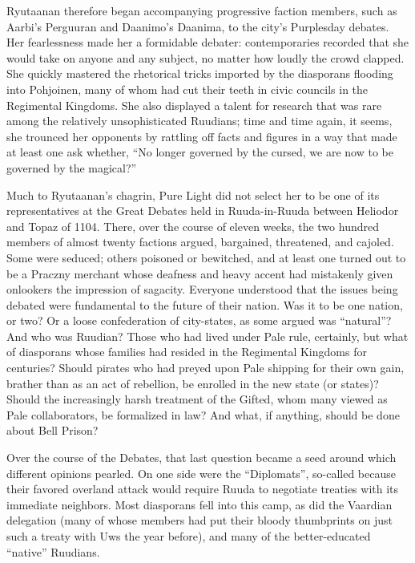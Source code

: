 \documentclass[12pt]{report}
\begin{document}
Ryutaanan therefore began accompanying progressive faction members,
such as Aarbi's Perguuran and Daanimo's Daanima, to the city's
Purplesday debates.  Her fearlessness made her a formidable debater:
contemporaries recorded that she would take on anyone and any subject,
no matter how loudly the crowd clapped.  She quickly mastered the
rhetorical tricks imported by the diasporans flooding into Pohjoinen,
many of whom had cut their teeth in civic councils in the Regimental
Kingdoms.  She also displayed a talent for research that was rare
among the relatively unsophisticated Ruudians; time and time again, it
seems, she trounced her opponents by rattling off facts and figures in
a way that made at least one ask whether, ``No longer governed by the
cursed, we are now to be governed by the magical?''

Much to Ryutaanan's chagrin, Pure Light did not select her to be one
of its representatives at the Great Debates held in Ruuda-in-Ruuda
between Heliodor and Topaz of 1104.  There, over the course of eleven
weeks, the two hundred members of almost twenty factions argued,
bargained, threatened, and cajoled.  Some were seduced; others
poisoned or bewitched, and at least one turned out to be a Praczny
merchant whose deafness and heavy accent had mistakenly given
onlookers the impression of sagacity.  Everyone understood that the
issues being debated were fundamental to the future of their nation.
Was it to be one nation, or two?  Or a loose confederation of
city-states, as some argued was ``natural''?  And who was Ruudian?
Those who had lived under Pale rule, certainly, but what of diasporans
whose families had resided in the Regimental Kingdoms for centuries?
Should pirates who had preyed upon Pale shipping for their own gain,
brather than as an act of rebellion, be enrolled in the new state (or
states)?  Should the increasingly harsh treatment of the Gifted, whom
many viewed as Pale collaborators, be formalized in law?  And what, if
anything, should be done about Bell Prison?

Over the course of the Debates, that last question became a seed
around which different opinions pearled.  On one side were the
``Diplomats'', so-called because their favored overland attack would
require Ruuda to negotiate treaties with its immediate neighbors.
Most diasporans fell into this camp, as did the Vaardian delegation
(many of whose members had put their bloody thumbprints on just such a
treaty with Uws the year before), and many of the better-educated
``native'' Ruudians.
\end{document}
